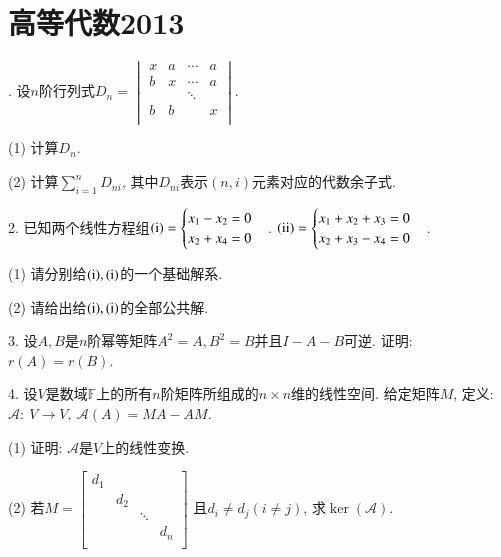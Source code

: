 \documentclass[12pt, a4paper, twoside]{ctexart}%
\newcommand{\rmnum}[1]{\romannumeral #1}
\begin{document}
	\section{高等代数2013}
	{\linespread{1.35}. 设$n$阶行列式$D_n=\begin{vmatrix}
		x&a&\cdots&a\\
		b&x&\cdots&a\\
		& &\ddots& \\
		b&b& &x\\
	\end{vmatrix}$.\par 
	\hspace{1.2em}(1) 计算$D_n$.\par 
	\hspace{1.2em}(2) 计算$\sum\limits_{i=1}^n D_{ni}$, 其中$D_{ni}$表示$(n,i)$元素对应的代数余子式.\par
	2. 已知两个线性方程组$(\mathrm{\rmnum{1}})=\begin{cases}
		x_1-x_2=0\\
		x_2+x_4=0\\
	\end{cases}$. $(\mathrm{\rmnum{2}})=\begin{cases}
	x_1+x_2+x_3=0\\
	x_2+x_3-x_4=0\\
	\end{cases}$.\par 
	\hspace{1.2em}(1) 请分别给$(\mathrm{\rmnum{1}}), (\mathrm{\rmnum{1}})$的一个基础解系.\par
	\hspace{1.2em}(2) 请给出给$(\mathrm{\rmnum{1}}), (\mathrm{\rmnum{1}})$的全部公共解.\par
	3. 设$A,B$是$n$阶幂等矩阵$A^2=A,B^2=B$并且$I-A-B$可逆. 证明: $r(A)=r(B)$.\par 
	4. 设$V$是数域$\mathbb{F}$上的所有$n$阶矩阵所组成的$n\times n$维的线性空间. 给定矩阵$M$, 定义: $\mathscr{A}:\ V\to V,\ \mathscr{A}(A)=MA-AM$.\par 
	\hspace{1.2em}(1) 证明: $\mathscr{A}$是$V$上的线性变换. \par
	\hspace{1.2em}(2) 若$M=\begin{bmatrix}
		d_1& & &\\
		 &d_2& & \\
		 & & \ddots& \\
		 & & &d_n\\
	\end{bmatrix}$ 且$d_i\neq d_j(i\neq j)$, 求$\ker(\mathscr{A})$.\par
}
\end{document}
